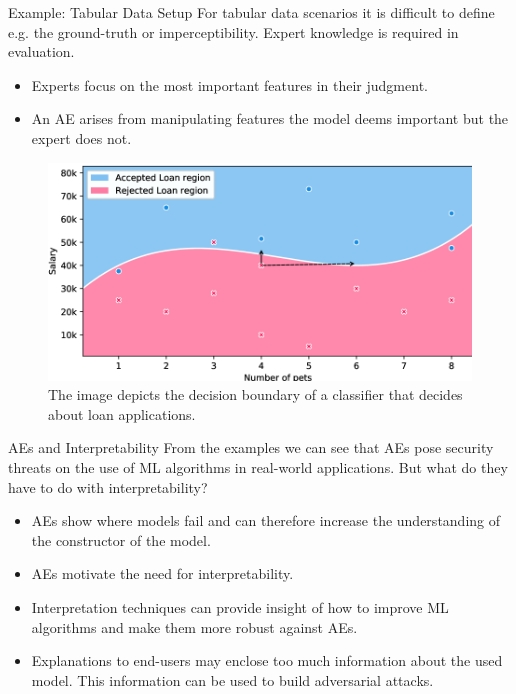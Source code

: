 \documentclass[11pt,compress,t,notes=noshow, xcolor=table]{beamer}
\begin{document}
\begin{vbframe}{Example: Tabular Data Setup}
For tabular data scenarios it is difficult to define e.g. the ground-truth or imperceptibility. Expert knowledge is required in evaluation.
\begin{itemize}
    \item Experts focus on the most important features in their judgment.
    \item An AE arises from manipulating features the model deems important but the expert does not.
\end{itemize}
\begin{figure}[h]
\centering
\includegraphics[width=0.6\linewidth]{figure/AEloanApplication.png}
  \caption{The image depicts the decision boundary of a classifier that decides about loan applications.}
  \label{fig:mnist}
\end{figure} 
\end{vbframe}

\begin{vbframe}{AEs and Interpretability}
From the examples we can see that AEs pose security threats on the use of ML algorithms in real-world applications. But what do they have to do with interpretability?

\begin{itemize}
    \item AEs show where models fail and can therefore increase the understanding of the constructor of the model.
    \item AEs motivate the need for interpretability.
    \item Interpretation techniques can provide insight of how to improve ML algorithms and make them more robust against AEs.
    \item Explanations to end-users may enclose too much information about the used model. This information can be used to build adversarial attacks.
\end{itemize}
\end{vbframe}
\end{document}
